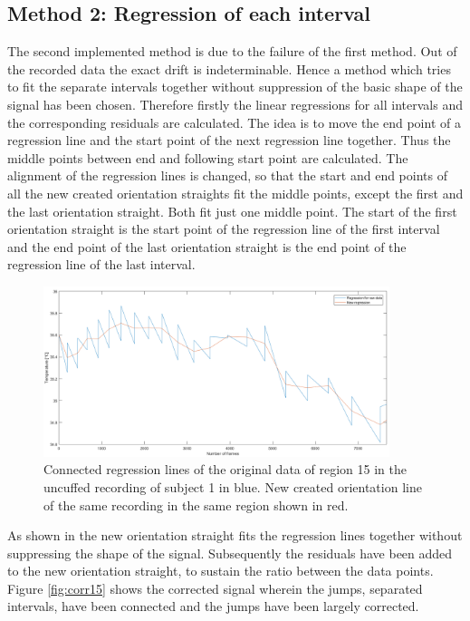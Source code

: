 \subsection{Method 2: Regression of each interval}

The second implemented method is due to the failure of the first method. Out of the recorded data the exact drift is indeterminable. Hence a method which tries to fit the separate intervals together without suppression of the basic shape of the signal has been chosen.
Therefore firstly the linear regressions for all intervals and the corresponding residuals are calculated.
The idea is to move the end point of a regression line and the start point of the next regression line together. Thus the middle points between end and following start point are calculated. The alignment of the regression lines is changed, so that the start and end points of all the new created orientation straights fit the middle points, except the first and the last orientation straight. Both fit just one middle point. The start of the first orientation straight is the start point of the regression line of the first interval and the end point of the last orientation straight is the end point of the regression line of the last interval.
\begin{figure}[H]
	\includegraphics[width=0.9\textwidth]{figures/reg15}
	\caption{Connected regression lines of the original data of region 15 in the uncuffed recording of subject 1 in blue. New created orientation line of the same recording in the same region shown in red.}
	\label{fig:reg15}
\end{figure}
As shown in  the new orientation straight fits the regression lines together without suppressing the shape of the signal. Subsequently the residuals have been added to the new orientation straight, to sustain the ratio between the data points. Figure \ref{fig:corr15} shows the corrected signal wherein the jumps, separated intervals, have been connected and the jumps have been largely corrected.
